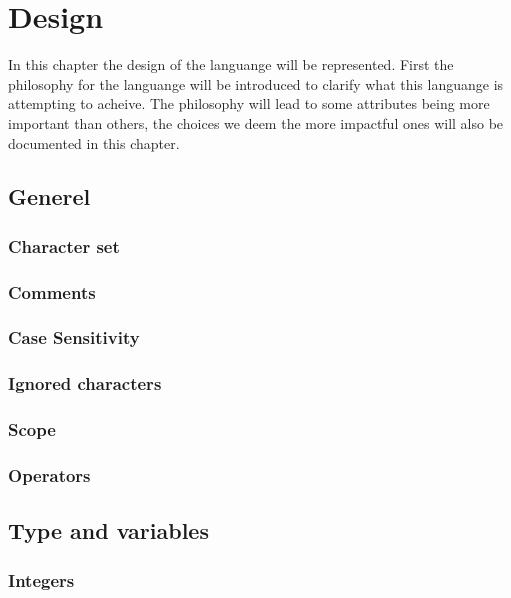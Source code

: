\chapter{Design}
\label{cha:Design}
In this chapter the design of the languange will be represented.
First the philosophy for the languange will be introduced to clarify what this languange is attempting to acheive.
The philosophy will lead to some attributes being more important than others, the choices we deem the more impactful ones will also be documented in this chapter.



\section{Generel}
\subsection{Character set}

\subsection{Comments}

\subsection{Case Sensitivity}

\subsection{Ignored characters}

\subsection{Scope}

\subsection{Operators}

\section{Type and variables}
\subsection{Integers}


